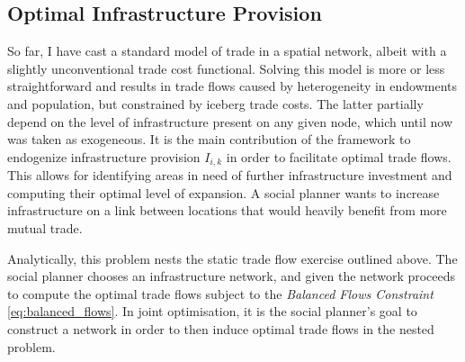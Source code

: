 \documentclass[11pt, oneside]{article}   	%
\begin{document}
\subsection{Optimal Infrastructure Provision}
So far, I have cast a standard model of trade in a spatial network, albeit with a slightly unconventional trade cost functional. Solving this model is more or less straightforward and results in trade flows caused by heterogeneity in endowments and population, but constrained by iceberg trade costs. The latter partially depend on the level of infrastructure present on any given node, which until now was taken as exogeneous. It is the main contribution of the \cite{fajgelbaum_optimal_2017} framework to endogenize infrastructure provision $I_{i,k}$ in order to facilitate optimal trade flows. This allows for identifying areas in need of further infrastructure investment and computing their optimal level of expansion. A social planner wants to increase infrastructure on a link between locations that would heavily benefit from more mutual trade.

Analytically, this problem nests the static trade flow exercise outlined above. The social planner chooses an infrastructure network, and given the network proceeds to compute the optimal trade flows subject to the \emph{Balanced Flows Constraint} \eqref{eq:balanced_flows}. In joint optimisation, it is the social planner's goal to construct a network in order to then induce optimal trade flows in the nested problem.
\end{document}
